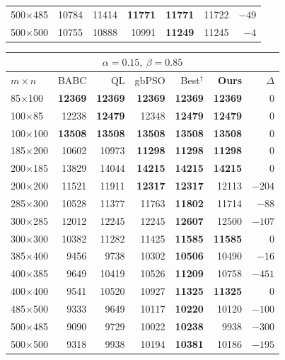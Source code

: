 \documentclass[12pt,preprintnumbers,amsmath,amssymb,nofootinbib,superscriptaddress]{revtex4-1}
\begin{document}
{\begin{tabular}{lrrrrrr}
500$\times$485 & 10784 & 11414 & \textbf{11771} & \textbf{11771} & \textcolor{Red!80!black}{11722} & $-49$\\
500$\times$500 & 10755 & 10888 & 10991 & \textbf{11249} & \textcolor{Red!80!black}{11245} & $-4$\\
\hline\hline
\end{tabular}
\hspace{0.8cm}
\begin{tabular}{lrrrrrr}
\hline\hline
\multicolumn{7}{c}{$\alpha=0.15,\ \beta=0.85$}\\
\hline
$m\times n$ & BABC & QL & gbPSO & Best$^{\dagger}$ & \textbf{Ours} & $\Delta$\\
\hline
85$\times$100 & \textbf{12369} & \textbf{12369} & \textbf{12369} & \textbf{12369} & \textbf{12369} & 0\\
100$\times$85 & 12238 & \textbf{12479} & 12348 & \textbf{12479} & \textbf{12479} & 0\\
100$\times$100 & \textbf{13508} & \textbf{13508} & \textbf{13508} & \textbf{13508} & \textbf{13508} & 0\\
185$\times$200 & 10602 & 10973 & \textbf{11298} & \textbf{11298} & \textbf{11298} & 0\\
200$\times$185 & 13829 & 14044 & \textbf{14215} & \textbf{14215} & \textbf{14215} & 0\\
200$\times$200 & 11521 & 11911 & \textbf{12317} & \textbf{12317} & \textcolor{Red!80!black}{12113} & $-204$\\
285$\times$300 & 10528 & 11377 & 11763 & \textbf{11802} & \textcolor{Red!80!black}{11714} & $-88$\\
300$\times$285 & 12012 & 12245 & 12245 & \textbf{12607} & \textcolor{Red!80!black}{12500} & $-107$\\
300$\times$300 & 10382 & 11282 & 11425 & \textbf{11585} & \textbf{11585} & 0\\
385$\times$400 & 9456 & 9738 & 10302 & \textbf{10506} & \textcolor{Red!80!black}{10490} & $-16$\\
400$\times$385 & 9649 & 10419 & 10526 & \textbf{11209} & \textcolor{Red!80!black}{10758} & $-451$\\
400$\times$400 & 9541 & 10520 & 10927 & \textbf{11325} & \textbf{11325} & 0\\
485$\times$500 & 9333 & 9649 & 10117 & \textbf{10220} & \textcolor{Red!80!black}{10120} & $-100$\\
500$\times$485 & 9090 & 9729 & 10022 & \textbf{10238} & \textcolor{Red!80!black}{9938} & $-300$\\
500$\times$500 & 9318 & 9938 & 10194 & \textbf{10381} & \textcolor{Red!80!black}{10186} & $-195$\\
\hline\hline
\end{tabular}
\par}
\end{document}
